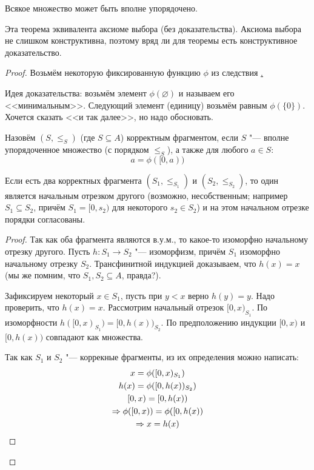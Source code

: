 \begin{theorem}[Цермелло]
	Всякое множество может быть вполне упорядочено.
\end{theorem}
\begin{Rem}
	Эта теорема эквивалента аксиоме выбора (без доказательства).
	Аксиома выбора не слишком конструктивна, поэтому вряд ли для теоремы есть конструктивное доказательство.
\end{Rem}
\begin{proof}
	Возьмём некоторую фиксированную функцию $\phi$ из следствия \href{axiom_of_choice_phi}.

	Идея доказательства: возьмём элемент $\phi(\varnothing)$ и называем его <<минимальным>>.
	Следующий элемент (единицу) возьмём равным $\phi(\{ 0 \})$.
	Хочется сказать <<и так далее>>, но надо обосновать.

	\begin{Def}
		Назовём $(S, \le_S)$ (где $S \subseteq A$) корректным фрагментом,
		если $S$ "--- вполне упорядоченное множество (с порядком $\le_S$), а также для любого $a \in S$:
		\[ a = \phi([0, a)) \]
	\end{Def}
	\begin{lemma}
		Если есть два корректных фрагмента $(S_1, \le_{S_1})$ и $(S_2, \le_{S_2})$,
		то один является начальным отрезком другого (возможно, несобственным; например $S_1 \subseteq S_2$, причём
		$S_1=[0,s_2)$ для некоторого $s_2 \in S_2$) и на этом начальном отрезке порядки согласованы.
	\end{lemma}
	\begin{proof}
		Так как оба фрагмента являются в.у.м., то какое-то изоморфно начальному отрезку другого.
		Пусть $h \colon S_1 \to S_2$ "--- изоморфизм, причём $S_1$ изоморфно начальному отрезку $S_2$.
		Трансфинитной индукцией доказываем, что $h(x)=x$ (мы же помним, что $S_1, S_2 \subseteq A$, правда?).

		Зафиксируем некоторый $x \in S_1$, пусть при $y < x$ верно $h(y)=y$.
		Надо проверить, что $h(x)=x$.
		Рассмотрим начальный отрезок $[0, x)_{S_1}$.
		По изоморфности $h([0, x)_{S_1}) = [0, h(x))_{S_2}$.
		По предположению индукции $[0, x)$ и $[0, h(x))$  совпадают как множества.

		Так как $S_1$ и $S_2$ "--- коррекные фрагменты, из их определения можно написать:
		\begin{gather*}
			x = \phi([0, x)_{S_1}) \\
			h(x) = \phi([0, h(x))_{S_2})\\
			[0, x) = [0, h(x))\\
			\Rightarrow \phi([0, x)) = \phi([0, h(x)) \\
			\Rightarrow x = h(x)
		\end{gather*}
		\end{proof}


\end{proof}
